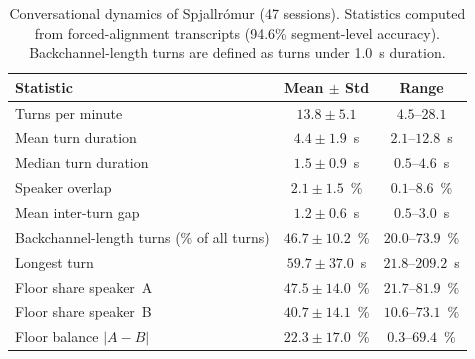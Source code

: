 \begin{table}[t]
  \caption{Conversational dynamics of Spjallr\'{o}mur (47 sessions).
           Statistics computed from forced-alignment transcripts
           (94.6\% segment-level accuracy). Backchannel-length turns
           are defined as turns under 1.0~s duration.}
  \label{tab:conv-stats}
  \centering
  \begin{tabular}{lcc}
    \toprule
    Statistic & Mean $\pm$ Std & Range \\
    \midrule
    Turns per minute & $13.8 \pm 5.1$ & $4.5$--$28.1$ \\
    Mean turn duration & $4.4 \pm 1.9$~s & $2.1$--$12.8$~s \\
    Median turn duration & $1.5 \pm 0.9$~s & $0.5$--$4.6$~s \\
    Speaker overlap & $2.1 \pm 1.5$~\% & $0.1$--$8.6$~\% \\
    Mean inter-turn gap & $1.2 \pm 0.6$~s & $0.5$--$3.0$~s \\
    Backchannel-length turns (\% of all turns) & $46.7 \pm 10.2$~\% & $20.0$--$73.9$~\% \\
    Longest turn & $59.7 \pm 37.0$~s & $21.8$--$209.2$~s \\
    Floor share speaker~A & $47.5 \pm 14.0$~\% & $21.7$--$81.9$~\% \\
    Floor share speaker~B & $40.7 \pm 14.1$~\% & $10.6$--$73.1$~\% \\
    Floor balance $|A - B|$ & $22.3 \pm 17.0$~\% & $0.3$--$69.4$~\% \\
    \bottomrule
  \end{tabular}
\end{table}
